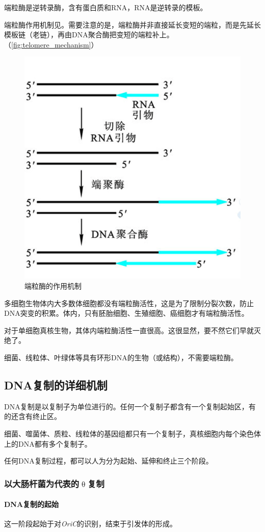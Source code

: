端粒酶是逆转录酶，含有蛋白质和RNA，RNA是逆转录的模板。

端粒酶作用机制见。需要注意的是，端粒酶并非直接延长变短的端粒，而是先延长模板链（老链），再由DNA聚合酶把变短的端粒补上。（\autoref{fig:telomere_mechanism}）

\begin{figure}[h]
	\centering
	\includegraphics[width=0.4\linewidth]{Pics/端粒酶1}
	\caption{端粒酶的作用机制}
	\label{fig:telomere_mechanism}
\end{figure}

多细胞生物体内大多数体细胞都没有端粒酶活性，这是为了限制分裂次数，防止DNA突变的积累。体内，只有胚胎细胞、生殖细胞、癌细胞才有端粒酶活性。

对于单细胞真核生物，其体内端粒酶活性一直很高。这很显然，要不然它们早就灭绝了。

细菌、线粒体、叶绿体等具有环形DNA的生物（或结构），不需要端粒酶。

\subsection{DNA复制的详细机制}

DNA复制是以复制子为单位进行的。任何一个复制子都含有一个复制起始区，有的还含有终止区。

细菌、噬菌体、质粒、线粒体的基因组都只有一个复制子，真核细胞内每个染色体上的DNA都有多个复制子。

任何DNA复制过程，都可以人为分为起始、延伸和终止三个阶段。

\subsubsection{以大肠杆菌为代表的$\uptheta$复制}
\paragraph{DNA复制的起始}
这一阶段起始于对\textit{OriC}的识别，结束于引发体的形成。

